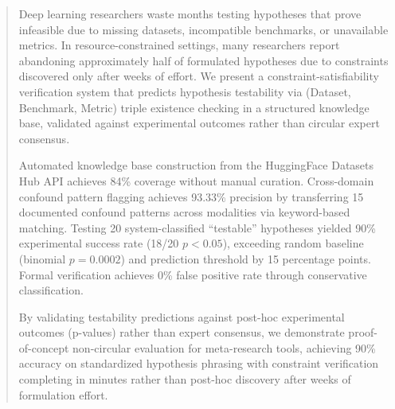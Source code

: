 \begin{abstract}
Deep learning researchers waste months testing hypotheses that prove infeasible due to missing datasets, incompatible benchmarks, or unavailable metrics. In resource-constrained settings, many researchers report abandoning approximately half of formulated hypotheses due to constraints discovered only after weeks of effort. We present a constraint-satisfiability verification system that predicts hypothesis testability via (Dataset, Benchmark, Metric) triple existence checking in a structured knowledge base, validated against experimental outcomes rather than circular expert consensus.

Automated knowledge base construction from the HuggingFace Datasets Hub API achieves 84\% coverage without manual curation. Cross-domain confound pattern flagging achieves 93.33\% precision by transferring 15 documented confound patterns across modalities via keyword-based matching. Testing 20 system-classified ``testable'' hypotheses yielded 90\% experimental success rate (18/20 $p < 0.05$), exceeding random baseline (binomial $p = 0.0002$) and prediction threshold by 15 percentage points. Formal verification achieves 0\% false positive rate through conservative classification.

By validating testability predictions against post-hoc experimental outcomes (p-values) rather than expert consensus, we demonstrate proof-of-concept non-circular evaluation for meta-research tools, achieving 90\% accuracy on standardized hypothesis phrasing with constraint verification completing in minutes rather than post-hoc discovery after weeks of formulation effort.
\end{abstract}
